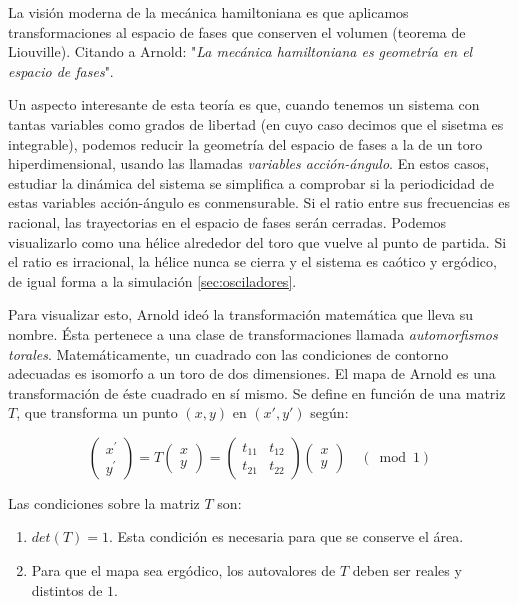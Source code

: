 \documentclass[11pt, a4paper]{article} %
\theoremstyle{named}
\begin{document}
La visión moderna de la mecánica hamiltoniana es que aplicamos transformaciones al espacio de fases que conserven el volumen (teorema de Liouville). Citando a Arnold: "\textit{La mecánica hamiltoniana es geometría en el espacio de fases}".

Un aspecto interesante de esta teoría es que, cuando tenemos un sistema con tantas variables como grados de libertad (en cuyo caso decimos que el sisetma es integrable), podemos reducir la geometría del espacio de fases a la de un toro hiperdimensional, usando las llamadas \textit{variables acción-ángulo}. En estos casos, estudiar la dinámica del sistema se simplifica a comprobar si la periodicidad de estas variables acción-ángulo es conmensurable. Si el ratio entre sus frecuencias es racional, las trayectorias en el espacio de fases serán cerradas. Podemos visualizarlo como una hélice alrededor del toro que vuelve al punto de partida. Si el ratio es irracional, la hélice nunca se cierra y el sistema es caótico y ergódico, de igual forma a la simulación \ref{sec:osciladores}.

Para visualizar esto, Arnold ideó la transformación matemática que lleva su nombre. Ésta pertenece a una clase de transformaciones llamada \textit{automorfismos torales}. Matemáticamente, un cuadrado con las condiciones de contorno adecuadas es isomorfo a un toro de dos dimensiones. El mapa de Arnold es una transformación de éste cuadrado en sí mismo. Se define en función de una matriz $T$, que transforma un punto $(x, y)$ en  $(x', y')$ según:

$$
\left(\begin{array}{l}
{x^{\prime}} \\
{y^{\prime}}
\end{array}\right)=T\left(\begin{array}{l}
{x} \\
{y}
\end{array}\right)=\left(\begin{array}{ll}
{t_{11}} & {t_{12}} \\
{t_{21}} & {t_{22}}
\end{array}\right)\left(\begin{array}{l}
{x} \\
{y}
\end{array}\right) \quad(\bmod 1)
$$

Las condiciones sobre la matriz $T$ son:

\begin{enumerate}
    \item $det(T) = 1$. Esta condición es necesaria para que se conserve el área.
    \item Para que el mapa sea ergódico, los autovalores de $T$ deben ser reales y distintos de $1$.
\end{enumerate}
\end{document}
